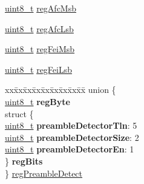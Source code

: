 \begin{DoxyCompactItemize}
\begin{tabbing}
\end{tabbing}\item 
\hyperlink{vl53l0x__types_8h_aba7bc1797add20fe3efdf37ced1182c5}{uint8\+\_\+t} \hyperlink{structFSK__Register__Map_affd05aea59c8554ad9ec8596d0e4bc4f}{reg\+Afc\+Msb}
\item 
\hyperlink{vl53l0x__types_8h_aba7bc1797add20fe3efdf37ced1182c5}{uint8\+\_\+t} \hyperlink{structFSK__Register__Map_a9e4aa98b29bf474fe44ad6a17b98930e}{reg\+Afc\+Lsb}
\item 
\hyperlink{vl53l0x__types_8h_aba7bc1797add20fe3efdf37ced1182c5}{uint8\+\_\+t} \hyperlink{structFSK__Register__Map_a5089be3b288eccb7a758e0c2ce874e3f}{reg\+Fei\+Msb}
\item 
\hyperlink{vl53l0x__types_8h_aba7bc1797add20fe3efdf37ced1182c5}{uint8\+\_\+t} \hyperlink{structFSK__Register__Map_a45a56b999282d713bd4cceb13d80c57a}{reg\+Fei\+Lsb}
\item 
\begin{tabbing}
xx\=xx\=xx\=xx\=xx\=xx\=xx\=xx\=xx\=\kill
union \{\\
\>\hyperlink{vl53l0x__types_8h_aba7bc1797add20fe3efdf37ced1182c5}{uint8\_t} {\bfseries regByte}\\
\>struct \{\\
\>\>\hyperlink{vl53l0x__types_8h_aba7bc1797add20fe3efdf37ced1182c5}{uint8\_t} {\bfseries preambleDetectorTln}: 5\\
\>\>\hyperlink{vl53l0x__types_8h_aba7bc1797add20fe3efdf37ced1182c5}{uint8\_t} {\bfseries preambleDetectorSize}: 2\\
\>\>\hyperlink{vl53l0x__types_8h_aba7bc1797add20fe3efdf37ced1182c5}{uint8\_t} {\bfseries preambleDetectorEn}: 1\\
\>\} {\bfseries regBits}\\
\} \hyperlink{structFSK__Register__Map_ace9b9c4930acfaa7153673072366fd53}{regPreambleDetect}\\


\end{tabbing}
\end{DoxyCompactItemize}
